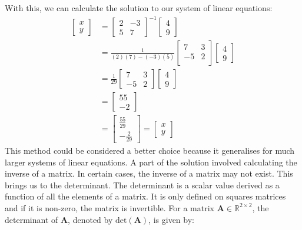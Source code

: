 \documentclass[a4paper,12pt]{book}
\newcommand{\matrx}[1]{\bm{#1}}
\newcommand{\real}{\mathbb{R}}
\newcommand{\dett}[1]{\text{det}(\matrx{#1})}
\begin{document}
	With this, we can calculate the solution to our system of linear equations:
	\begin{align}
		\begin{bmatrix}
			x \\ 
			y
		\end{bmatrix} &= \begin{bmatrix}
			2 & -3 \\
			5 & 7 
		\end{bmatrix}^{-1} \begin{bmatrix}
			4 \\
			9
		\end{bmatrix} \\
		&= \frac{1}{(2)(7)-(-3)(5)} \begin{bmatrix}
			7 & 3 \\
			-5 & 2 \\
		\end{bmatrix} \begin{bmatrix}
			4 \\
			9
		\end{bmatrix} \\
		 &= \frac{1}{29} \begin{bmatrix}
			7 & 3 \\
			-5 & 2
		\end{bmatrix} \begin{bmatrix}
			4 \\
			9
		\end{bmatrix} \\
		&= \begin{bmatrix}
			55 \\
			-2
		\end{bmatrix} \\
		&= \begin{bmatrix}
			\frac{55}{29} \\
			- \frac{2}{29}
		\end{bmatrix} = \begin{bmatrix}
		x \\
		y
	\end{bmatrix}
	\end{align}
	This method could be considered a better choice because it generalises for much larger systems of linear equations. A part of the solution involved calculating the inverse of a matrix. In certain cases, the inverse of a matrix may not exist. This brings us to the determinant. The determinant is a scalar value derived as a function of all the elements of a matrix. It is only defined on squares matrices and if it is non-zero, the matrix is invertible. For a matrix $ \matrx{A} \in \real^{2 \times 2} $, the determinant of $ \matrx{A} $, denoted by $ \dett{A} $, is given by:
\end{document}
